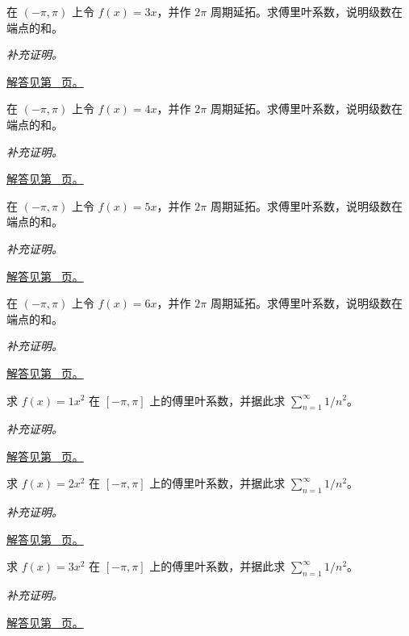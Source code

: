 \documentclass[UTF8,12pt,a4paper,fontset=fandol]{ctexart}
\begin{document}
\begin{example}[锯齿函数的傅里叶系数]\label{ex:c28q15}
在 $(-\pi,\pi)$ 上令 $f(x)=3x$，并作 $2\pi$ 周期延拓。求傅里叶系数，说明级数在端点的和。
\par\textit{补充证明。}\par\hyperref[ans:c28q15]{解答见第~\pageref{ans:c28q15} 页。}
\end{example}
\begin{example}[锯齿函数的傅里叶系数]\label{ex:c28q16}
在 $(-\pi,\pi)$ 上令 $f(x)=4x$，并作 $2\pi$ 周期延拓。求傅里叶系数，说明级数在端点的和。
\par\textit{补充证明。}\par\hyperref[ans:c28q16]{解答见第~\pageref{ans:c28q16} 页。}
\end{example}
\begin{example}[锯齿函数的傅里叶系数]\label{ex:c28q17}
在 $(-\pi,\pi)$ 上令 $f(x)=5x$，并作 $2\pi$ 周期延拓。求傅里叶系数，说明级数在端点的和。
\par\textit{补充证明。}\par\hyperref[ans:c28q17]{解答见第~\pageref{ans:c28q17} 页。}
\end{example}
\begin{example}[锯齿函数的傅里叶系数]\label{ex:c28q18}
在 $(-\pi,\pi)$ 上令 $f(x)=6x$，并作 $2\pi$ 周期延拓。求傅里叶系数，说明级数在端点的和。
\par\textit{补充证明。}\par\hyperref[ans:c28q18]{解答见第~\pageref{ans:c28q18} 页。}
\end{example}
\begin{example}[平方函数的余弦展开]\label{ex:c28q19}
求 $f(x)=1x^2$ 在 $[-\pi,\pi]$ 上的傅里叶系数，并据此求 $\sum_{n=1}^\infty1/n^2$。
\par\textit{补充证明。}\par\hyperref[ans:c28q19]{解答见第~\pageref{ans:c28q19} 页。}
\end{example}
\begin{example}[平方函数的余弦展开]\label{ex:c28q20}
求 $f(x)=2x^2$ 在 $[-\pi,\pi]$ 上的傅里叶系数，并据此求 $\sum_{n=1}^\infty1/n^2$。
\par\textit{补充证明。}\par\hyperref[ans:c28q20]{解答见第~\pageref{ans:c28q20} 页。}
\end{example}
\begin{example}[平方函数的余弦展开]\label{ex:c28q21}
求 $f(x)=3x^2$ 在 $[-\pi,\pi]$ 上的傅里叶系数，并据此求 $\sum_{n=1}^\infty1/n^2$。
\par\textit{补充证明。}\par\hyperref[ans:c28q21]{解答见第~\pageref{ans:c28q21} 页。}
\end{example}
\end{document}
